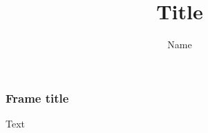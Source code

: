 \documentclass[aspectratio=1610]{beamer}
\title[Title short]{Title}
\author[Name short]{Name}
\begin{document}
\begin{frame}[plain]%
  \titlepage
\end{frame}

\begin{frame}
  \frametitle{Frame title}
  Text
\end{frame}


\begin{frame}[plain]
  \endpage
\end{frame}

\end{document}
